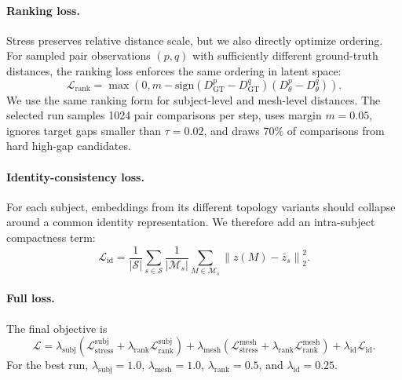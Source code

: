 \documentclass{article}
\begin{document}
\paragraph{Ranking loss.}
Stress preserves relative distance scale, but we also directly optimize ordering. For sampled pair observations $(p,q)$ with sufficiently different ground-truth distances, the ranking loss enforces the same ordering in latent space:
\begin{equation}
    \mathcal{L}_{\mathrm{rank}}
    =
    \max\left(0, m - \mathrm{sign}(D_{\mathrm{GT}}^p-D_{\mathrm{GT}}^q)
    (D_\theta^p-D_\theta^q)\right).
\end{equation}
We use the same ranking form for subject-level and mesh-level distances. The selected run samples 1024 pair comparisons per step, uses margin $m=0.05$, ignores target gaps smaller than $\tau=0.02$, and draws $70\%$ of comparisons from hard high-gap candidates.

\paragraph{Identity-consistency loss.}
For each subject, embeddings from its different topology variants should collapse around a common identity representation. We therefore add an intra-subject compactness term:
\begin{equation}
    \mathcal{L}_{\mathrm{id}}
    =
    \frac{1}{|\mathcal{S}|}
    \sum_{s\in\mathcal{S}}
    \frac{1}{|\mathcal{M}_s|}
    \sum_{M\in\mathcal{M}_s}
    \left\|z(M)-\bar{z}_s\right\|_2^2.
\end{equation}

\paragraph{Full loss.}
The final objective is
\begin{equation}
    \mathcal{L}
    =
    \lambda_{\mathrm{subj}}
    \left(
        \mathcal{L}_{\mathrm{stress}}^{\mathrm{subj}}
        +
        \lambda_{\mathrm{rank}}\mathcal{L}_{\mathrm{rank}}^{\mathrm{subj}}
    \right)
    +
    \lambda_{\mathrm{mesh}}
    \left(
        \mathcal{L}_{\mathrm{stress}}^{\mathrm{mesh}}
        +
        \lambda_{\mathrm{rank}}\mathcal{L}_{\mathrm{rank}}^{\mathrm{mesh}}
    \right)
    +
    \lambda_{\mathrm{id}}\mathcal{L}_{\mathrm{id}}.
\end{equation}
For the best run, $\lambda_{\mathrm{subj}}=1.0$, $\lambda_{\mathrm{mesh}}=1.0$, $\lambda_{\mathrm{rank}}=0.5$, and $\lambda_{\mathrm{id}}=0.25$.
\end{document}
